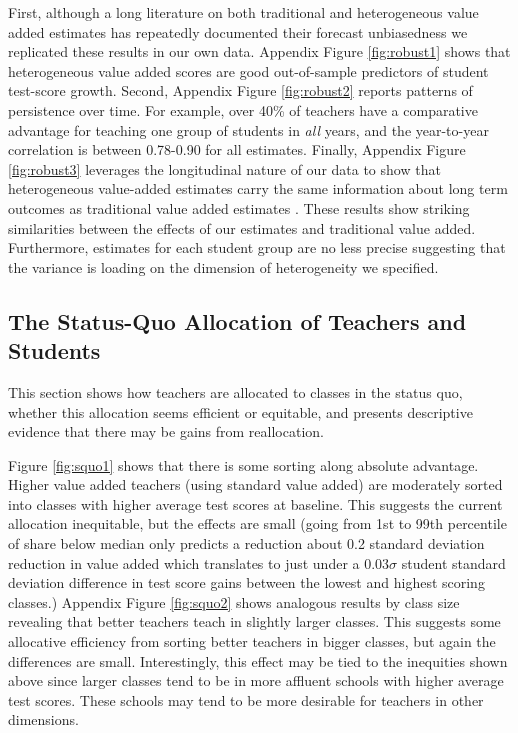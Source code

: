 \documentclass[12pt]{article}
\theoremstyle{definition}
\theoremstyle{definition}
\theoremstyle{definition}
\theoremstyle{definition}
\begin{document}
First, although a long literature on both traditional and heterogeneous value added estimates has repeatedly documented their forecast unbiasedness \citep[e.g.,][]{chetty2014measuring1,Delgado2020,bates2022teacher} we replicated these results in our own data. Appendix Figure \ref{fig:robust1} shows that heterogeneous value added scores are good out-of-sample predictors of student test-score growth. Second,  Appendix Figure \ref{fig:robust2} reports patterns of persistence over time. For example, over 40\% of teachers have a comparative advantage for teaching one group of students in \textit{all} years, and the year-to-year correlation is between 0.78-0.90 for all estimates.%
 Finally, Appendix Figure \ref{fig:robust3} leverages the longitudinal nature of our data to show that heterogeneous value-added estimates carry the same information about long term outcomes as traditional value added estimates \citep{chetty2014measuring2}. These results show striking similarities between the effects of our estimates and traditional value added. Furthermore, estimates for each student group are no less precise suggesting that the variance is loading on the dimension of heterogeneity we specified.

\subsection{The Status-Quo Allocation of Teachers and Students} \label{squo}

This section shows how teachers are allocated to classes in the status quo, whether this allocation seems efficient or equitable, and presents descriptive evidence that there may be gains from reallocation.

Figure \ref{fig:squo1} shows that there is some sorting along absolute advantage. Higher value added teachers (using standard value added) are moderately sorted into classes with higher average test scores at baseline. This suggests the current allocation inequitable, but the effects are small (going from 1st to 99th percentile of share below median only predicts a reduction about 0.2 standard deviation reduction in value added which translates to just under a 0.03$\sigma$ student standard deviation difference in test score gains between the lowest and highest scoring classes.) Appendix Figure \ref{fig:squo2} shows analogous results by class size revealing that better teachers teach in slightly larger classes. This suggests some allocative efficiency from sorting better teachers in bigger classes, but again the differences are small. Interestingly, this effect may be tied to the inequities shown above since larger classes tend to be in more affluent schools with higher average test scores. These schools may tend to be more desirable for teachers in other dimensions.
\end{document}
